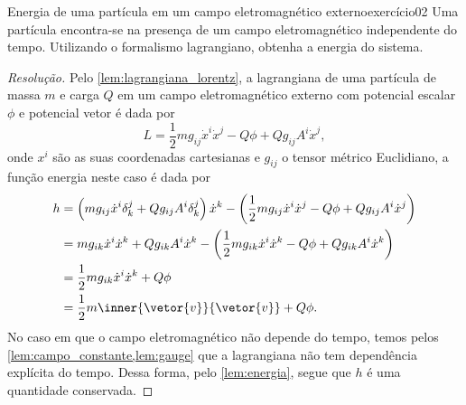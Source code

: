 \begin{exercício}{Energia de uma partícula em um campo eletromagnético externo}{exercício02}
    Uma partícula encontra-se na presença de um campo eletromagnético independente do tempo. Utilizando o formalismo lagrangiano, obtenha a energia do sistema.
\end{exercício}
\begin{proof}[Resolução]
    Pelo \cref{lem:lagrangiana_lorentz}, a lagrangiana de uma partícula de massa \(m\) e carga \(Q\) em um campo eletromagnético externo com potencial escalar \(\phi\) e potencial vetor  é dada por
    \begin{equation*}
        L = \frac12 m g_{ij} \dot{x}^i \dot{x}^j - Q\phi + Q g_{ij} A^i \dot{x}^j,
    \end{equation*}
    onde \(x^i\) são as suas coordenadas cartesianas e \(g_{ij}\) o tensor métrico Euclidiano, a função energia neste caso é dada por
    \begin{align*}
        h &= \left(mg_{ij} \dot{x}^i \delta^j_k + Q g_{ij} A^i \delta^j_k\right)\dot{x}^k - \left( \frac12 m g_{ij} \dot{x}^i \dot{x}^j - Q\phi +Q g_{ij} A^i \dot{x}^j\right)\\
          &= m g_{ik}\dot{x}^i \dot{x}^k + Qg_{ik}A^i\dot{x}^k - \left(\frac12 m g_{ik} \dot{x}^i \dot{x}^k - Q\phi + Qg_{ik} A^i \dot{x}^k\right)\\
          &= \frac12 m g_{ik} \dot{x}^i\dot{x}^k + Q\phi\\
          &= \frac12 m \inner{\vetor{v}}{\vetor{v}} + Q\phi.
    \end{align*}
    No caso em que o campo eletromagnético não depende do tempo, temos pelos \cref{lem:campo_constante,lem:gauge} que a lagrangiana não tem dependência explícita do tempo. Dessa forma, pelo \cref{lem:energia}, segue que \(h\) é uma quantidade conservada.
\end{proof}
